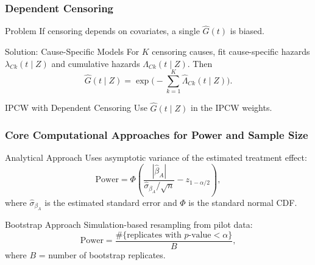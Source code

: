 \documentclass{beamer}
\begin{document}
\begin{frame}
\frametitle{Dependent Censoring}

\begin{block}{Problem}
If censoring depends on covariates, a single $\widehat{G}(t)$ is biased.
\end{block}

\begin{block}{Solution: Cause-Specific Models}
For $K$ censoring causes, fit cause-specific hazards $\lambda_{Ck}(t \mid Z)$ and cumulative hazards $\Lambda_{Ck}(t \mid Z)$.  
Then
\[
\widehat{G}(t \mid Z) = \exp\!\Big(-\sum_{k=1}^K \widehat{\Lambda}_{Ck}(t \mid Z)\Big).
\]
\end{block}

\begin{block}{IPCW with Dependent Censoring}
Use $\widehat{G}(t \mid Z)$ in the IPCW weights.
\end{block}

\end{frame}

\begin{frame}
\frametitle{Core Computational Approaches for Power and Sample Size}

\begin{block}{Analytical Approach}
Uses asymptotic variance of the estimated treatment effect:
\[
\text{Power} = 
\Phi\!\left( 
\frac{|\widehat{\beta}_A|}{\widehat{\sigma}_{\beta_A}/\sqrt{n}} - z_{1-\alpha/2}
\right),
\]
where $\widehat{\sigma}_{\beta_A}$ is the estimated standard error and $\Phi$ is the standard normal CDF.
\end{block}

\begin{block}{Bootstrap Approach}
Simulation-based resampling from pilot data:
\[
\text{Power} =
\frac{\#\{\text{replicates with $p$-value} < \alpha\}}{B},
\]
where $B$ = number of bootstrap replicates.
\end{block}

\end{frame}
\end{document}
